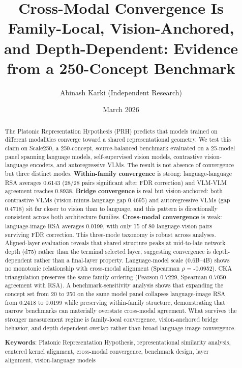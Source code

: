 \documentclass[11pt,a4paper]{article}
\title{Cross-Modal Convergence Is Family-Local, Vision-Anchored, and
Depth-Dependent: Evidence from a 250-Concept Benchmark}
\author{Abinash Karki (Independent Research)}
\date{March 2026}
\begin{document}
\maketitle

\begin{abstract}
The Platonic Representation Hypothesis (PRH) predicts that models
trained on different modalities converge toward a shared
representational geometry. We test this claim on Scale250, a
250-concept, source-balanced benchmark evaluated on a 25-model panel
spanning language models, self-supervised vision models, contrastive
vision-language encoders, and autoregressive VLMs. The result is not
absence of convergence but three distinct modes. \textbf{Within-family
convergence} is strong: language-language RSA averages 0.6143 (28/28
pairs significant after FDR correction) and VLM-VLM agreement reaches
0.8938. \textbf{Bridge convergence} is real but vision-anchored: both
contrastive VLMs (vision-minus-language gap 0.4695) and autoregressive
VLMs (gap 0.4718) sit far closer to vision than to language, and this
pattern is directionally consistent across both architecture families.
\textbf{Cross-modal convergence} is weak: language-image RSA averages
0.0199, with only 15 of 80 language-vision pairs surviving FDR
correction. This three-mode taxonomy is robust across analyses.
Aligned-layer evaluation reveals that shared structure peaks at
mid-to-late network depth (d75) rather than the terminal selected layer,
suggesting convergence is depth-dependent rather than a final-layer
property. Language-model scale (0.6B--4B) shows no monotonic
relationship with cross-modal alignment (Spearman \(\rho\) = -0.0952).
CKA triangulation preserves the same family ordering (Pearson 0.7229,
Spearman 0.7050 agreement with RSA). A benchmark-sensitivity analysis
shows that expanding the concept set from 20 to 250 on the same model
panel collapses language-image RSA from 0.2418 to 0.0199 while
preserving within-family structure, demonstrating that narrow benchmarks
can materially overstate cross-modal agreement. What survives the
stronger measurement regime is family-local convergence, vision-anchored
bridge behavior, and depth-dependent overlap rather than broad
language-image convergence.

\textbf{Keywords}: Platonic Representation Hypothesis, representational
similarity analysis, centered kernel alignment, cross-modal convergence,
benchmark design, layer alignment, vision-language models
\end{abstract}
\end{document}
